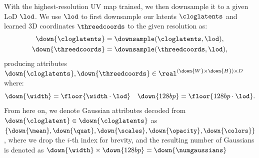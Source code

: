     With the highest-resolution UV map trained, we then downsample it to a given
    LoD $\lod$.
    We use $\lod$ to first downsample our latents $\cloglatents$ and learned 3D coordinates $\threedcoords$ to the given resolution as:
    \begin{equation}
      \begin{aligned}
        \down{\cloglatents}  & = \downsample(\cloglatents, \lod),  \\
        \down{\threedcoords} & = \downsample(\threedcoords, \lod),
      \end{aligned}
    \end{equation}
    producing attributes $\down{\cloglatents},\down{\threedcoords} \in \real^{(\down{W} \times \down{H}) \times D}$ where:
    \begin{equation}
      \down{\width} = \floor{\width \cdot \lod}\quad \down{\height} = \floor{\height \cdot \lod}.
    \end{equation}
    From here on, we denote Gaussian attributes decoded from $\down{\cloglatent}
      \in \down{\cloglatents}$ as
    $\{\down{\mean},\down{\quat},\down{\scales},\down{\opacity},\down{\colors}\}$,
    where we drop the $i$-th index for brevity, and the resulting number of
    Gaussians is denoted as $\down{\width} \times \down{\height} =
      \down{\numgaussians}$

